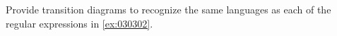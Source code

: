 \begin{exercise}\label{ex:030401}
    Provide transition diagrams to recognize the same languages as each of the 
    regular expressions in \cref{ex:030302}.
\end{exercise}
\begin{solution}\label{sol:030401}
\end{solution}